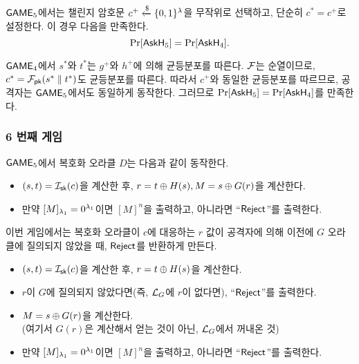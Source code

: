 $\textsf{GAME}_5$에서는 챌린지 암호문 $c^+ \xleftarrow{\$} \{0,1\}^{\lambda}$을 무작위로 선택하고, 단순히
$c^* = c^+$로 설정한다. 이 경우 다음을 만족한다.
$$
	\Pr[\textsf{AskH}_5] = \Pr[\textsf{AskH}_4].
$$

\begin{memo}
	$\textsf{GAME}_4$에서 $s^*$와 $t^*$는 $g^+$와 $h^+$에 의해 균등분포를 따른다. $\mathcal{F}$는
	순열이므로, $c^* = \mathcal{F}_{\textsf{pk}}(s^* \parallel t^*)$도 균등분포를 따른다. 따라서 $c^+$와
	동일한 균등분포를 따르므로, 공격자는 $\textsf{GAME}_5$에서도 동일하게 동작한다.
	그러므로 $\Pr[\textsf{AskH}_5] = \Pr[\textsf{AskH}_4]$를 만족한다.
\end{memo}

\newpage
\subsubsection{6 번째 게임}

\begin{memo}
	$\textsf{GAME}_5$에서 복호화 오라클 $D$는 다음과 같이 동작한다.
	\begin{tcolorbox}
		\begin{itemize}
			\item $(s,t) = \mathcal{I}_{\textsf{sk}}(c)$을 계산한 후, $r = t \oplus H(s), M = s
			\oplus G(r)$을 계산한다.
			\item 만약 $[M]_{\lambda_1} = 0^{\lambda_1}$이면 $[M]^{n}$을 출력하고,
			아니라면 “$\textsf{Reject}$”를 출력한다.
		\end{itemize}
	\end{tcolorbox}
\end{memo}

이번 게임에서는 복호화 오라클이 $c$에 대응하는 $r$ 값이 공격자에 의해 이전에 $G$
오라클에 질의되지 않았을 때, $\textsf{Reject}$를 반환하게 만든다.

\begin{tcolorbox}
	\begin{itemize}
		\item $(s,t) = \mathcal{I}_{\textsf{sk}}(c)$을 계산한 후, $r = t \oplus H(s)$을 계산한다.
		\item $r$이 $G$에 질의되지 않았다면(즉, $\mathcal{L}_G$에 $r$이 없다면), “$\textsf{Reject}$”를 출력한다.
		\item $M = s \oplus G(r)$을 계산한다. \\ (여기서 $G(r)$은 계산해서 얻는 것이 아닌, $\mathcal{L}_G$에서 꺼내온 것)
		\item 만약 $[M]_{\lambda_1} = 0^{\lambda_1}$이면 $[M]^{n}$을 출력하고,
		아니라면 “$\textsf{Reject}$”를 출력한다.
	\end{itemize}
\end{tcolorbox}

